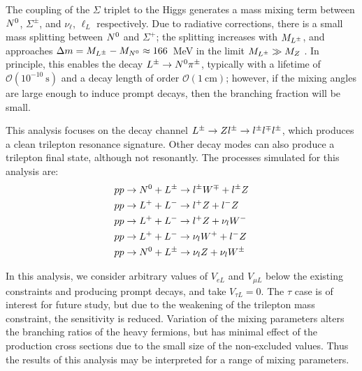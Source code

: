 The coupling of the $\Sigma$ triplet to the Higgs generates a mass mixing term between $N^{0}$, $\Sigma^\pm$, and $\nu_\ell$, $\ell_L$ respectively. Due to radiative corrections, there is a small mass splitting between $N^{0}$ and $\Sigma^+$; the splitting increases with $M_{L^{\pm}}$, and approaches $\Delta m = M_{L^{\pm}} - M_{N^{0}} \approx166$~MeV in the limit $M_{L^{\pm}}\gg M_Z$ \cite{Cirelli2006178,Franceschini:2008pz}. In principle, this enables the decay $\lpm\rightarrow \lzero \pi^{\pm}$, typically with a lifetime of $\mathcal{O}(10^{-10}~\mbox{s})$ and a decay length of order $\mathcal{O}(1~\mbox{cm})$; however, if the mixing angles are large enough to induce prompt decays, then the branching fraction will be small. 



This analysis focuses on the decay channel $L^{\pm}\rightarrow Zl^{\pm} \rightarrow l^{\pm}l^{\mp}l^{\pm}$, which produces a clean trilepton resonance signature. Other decay modes can also produce a trilepton final state, although not resonantly. The processes simulated for this analysis are:
\begin{align}
    pp&\rightarrow N^{0}+L^{\pm}\rightarrow l^{\pm}W^{\mp}+l^{\pm}Z  \\
    pp&\rightarrow L^{+}+L^{-}\rightarrow l^{+}Z+l^{-}Z  \\
    pp&\rightarrow L^{+}+L^{-}\rightarrow l^{+}Z+\nu_{l}W^{-}  \\
    pp&\rightarrow L^{+}+L^{-}\rightarrow\nu_{l}W^{+}+l^{-}Z  \\
    pp&\rightarrow N^{0}+L^{\pm}\rightarrow\nu_{l}Z+\nu_{l}W^{\pm} \\
\end{align}



In this analysis, we consider arbitrary values of $V_{e L}$ and $V_{\mu L}$ below the existing constraints and producing prompt decays, and take $V_{\tau L}=0$. The $\tau$ case is of interest for future study, but due to the weakening of the trilepton mass constraint, the sensitivity is reduced. Variation of the mixing parameters alters the branching ratios of the heavy fermions, but has minimal effect of the production cross sections due to the small size of the non-excluded values. Thus the results of this analysis may be interpreted for a range of mixing parameters.




